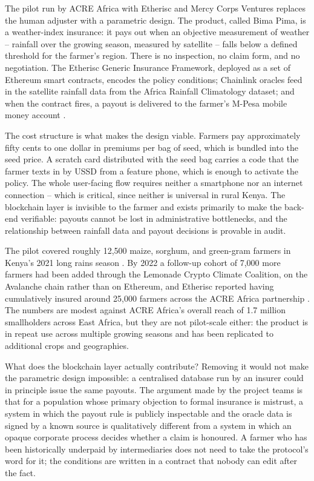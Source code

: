 The pilot run by ACRE Africa with Etherisc and Mercy Corps Ventures
replaces the human adjuster with a parametric design. The product, called
Bima Pima, is a weather-index insurance: it pays out when an objective
measurement of weather -- rainfall over the growing season, measured by
satellite -- falls below a defined threshold for the farmer's region. There
is no inspection, no claim form, and no negotiation. The Etherisc Generic
Insurance Framework, deployed as a set of Ethereum smart contracts,
encodes the policy conditions; Chainlink oracles feed in the satellite
rainfall data from the Africa Rainfall Climatology dataset; and when the
contract fires, a payout is delivered to the farmer's M-Pesa mobile money
account \cite{mercyCorpsEtherisc2022}.

The cost structure is what makes the design viable. Farmers pay
approximately fifty cents to one dollar in premiums per bag of seed, which
is bundled into the seed price. A scratch card distributed with the seed
bag carries a code that the farmer texts in by USSD from a feature phone,
which is enough to activate the policy. The whole user-facing flow
requires neither a smartphone nor an internet connection -- which is
critical, since neither is universal in rural Kenya. The blockchain layer
is invisible to the farmer and exists primarily to make the back-end
verifiable: payouts cannot be lost in administrative bottlenecks, and the
relationship between rainfall data and payout decisions is provable
in audit.

The pilot covered roughly 12{,}500 maize, sorghum, and green-gram farmers
in Kenya's 2021 long rains season \cite{mercyCorpsEtherisc2022}. By 2022 a
follow-up cohort of 7{,}000 more farmers had been added through the
Lemonade Crypto Climate Coalition, on the Avalanche chain rather than on
Ethereum, and Etherisc reported having cumulatively insured around
25{,}000 farmers across the ACRE Africa partnership
\cite{etheriscLcc2023}. The numbers are modest against ACRE Africa's
overall reach of 1.7 million smallholders across East Africa, but they are
not pilot-scale either: the product is in repeat use across multiple
growing seasons and has been replicated to additional crops and
geographies.

What does the blockchain layer actually contribute? Removing it would not
make the parametric design impossible: a centralised database run by an
insurer could in principle issue the same payouts. The argument made by
the project teams is that for a population whose primary objection to
formal insurance is mistrust, a system in which the payout rule is
publicly inspectable and the oracle data is signed by a known source is
qualitatively different from a system in which an opaque corporate process
decides whether a claim is honoured. A farmer who has been historically
underpaid by intermediaries does not need to take the protocol's word for
it; the conditions are written in a contract that nobody can edit after
the fact.

